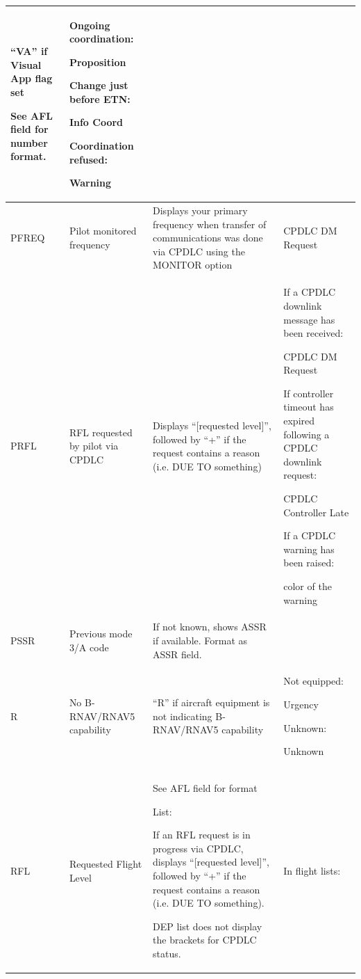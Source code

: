 \documentclass[11pt,a4paper,oldfontcommands]{memoir}
\begin{document}
\begin{longtable}{|p{2.5cm}|p{2.5cm}|p{4.5cm}|p{4.5cm}|}
      “VA” if Visual App flag set
      
      See AFL field for number format. &
      Ongoing coordination:
      
      Proposition 
      \bigskip
      
      Change just before ETN: 
      
      Info Coord 
      \bigskip
      
      Coordination refused: 
      
      Warning \\ \hline
    PFREQ &
      Pilot monitored frequency &
      Displays your primary frequency  when transfer of communications  was done via CPDLC using the  MONITOR option &
      CPDLC DM Request \\ \hline
    PRFL &
      RFL requested by pilot via  CPDLC &
      Displays “{[}requested level{]}”,  followed by “+” if the request  contains a reason (i.e. DUE TO  something) &
      If a CPDLC downlink  message has been  received:  
      
      CPDLC DM Request 
      \bigskip
      
      If controller timeout has expired following a CPDLC downlink request:
      
      CPDLC Controller Late 
      \bigskip
      
      If a CPDLC warning has been raised: 
      
      color of the warning \\ \hline
    PSSR &
      Previous mode 3/A code &
      If not known, shows ASSR if  available. Format as ASSR field. &
       \\ \hline
    R &
      No B-RNAV/RNAV5  capability &
      “R” if aircraft equipment is not  indicating B-RNAV/RNAV5 capability &
      Not equipped:
      
      Urgency
      \bigskip 
      
      Unknown: 
      
      Unknown \\ \hline
    RFL &
      Requested Flight Level &
      See AFL field for format 
      \bigskip
      
      List: 
      
      If an RFL request is in progress via CPDLC, displays “{[}requested level{]}”, followed by “+” if the request contains a reason (i.e. DUE TO  something). 
      \bigskip
      
      DEP list does not display the  brackets for CPDLC status. &
      In flight lists: 
      

\end{longtable}
\end{document}
